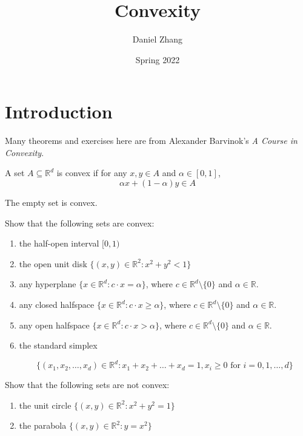 \documentclass{article}
\title{Convexity}
\author{Daniel Zhang}
\date{Spring 2022}
\begin{document}
\section{Introduction}

Many theorems and exercises here are from Alexander Barvinok's \textit{A Course in Convexity}.

\begin{definition}

A set $A\subseteq\mathbb{R}^d$ is convex if for any $x,y\in A$ and $\alpha\in[0,1]$, \[\alpha x+(1-\alpha)y\in A\]

The empty set is convex.

\end{definition}



\begin{exercise}

Show that the following sets are convex:

\begin{enumerate}[label=(\alph*)]

\item the half-open interval $[0,1)$

\item the open unit disk $\{(x,y)\in\mathbb{R}^2:x^2+y^2<1\}$

\item any hyperplane $\{x\in\mathbb{R}^d:c\cdot x= \alpha\}$, where $c\in\mathbb{R}^d\setminus\{0\}$ and $\alpha\in\mathbb{R}$.

\item any closed halfspace $\{x\in\mathbb{R}^d:c\cdot x\ge  \alpha\}$, where $c\in\mathbb{R}^d\setminus\{0\}$ and $\alpha\in\mathbb{R}$.

\item any open halfspace $\{x\in\mathbb{R}^d:c\cdot x>\alpha\}$, where $c\in\mathbb{R}^d\setminus\{0\}$ and $\alpha\in\mathbb{R}$.

\item the standard simplex

\[\{(x_1,x_2,\ldots,x_d)\in\mathbb{R}^d:x_1+x_2+\ldots+x_d=1,x_i\ge 0\text{ for $i=0,1,\ldots,d$}\}\]

\end{enumerate}

\end{exercise}



\begin{exercise}

Show that the following sets are not convex:

\begin{enumerate}[label=(\alph*)]

\item the unit circle $\{(x,y)\in\mathbb{R}^2:x^2+y^2=1\}$

\item the parabola $\{(x,y)\in\mathbb{R}^2:y=x^2\}$

\end{enumerate}

\end{exercise}
\end{document}
